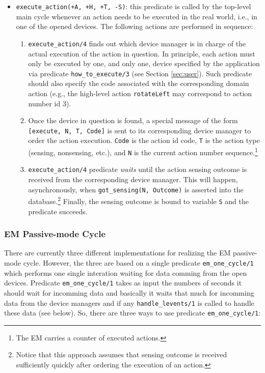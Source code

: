 \documentclass[11pt]{article}
\begin{document}
\begin{itemize}
\item \texttt{execute\_action(+A, +H, +T, -S)}: this predicate is called by the
top-level main cycle whenever an action needs to be executed in the real world,
i.e., in one of the opened devices. The following actions are performed in
sequence:
\begin{enumerate}
  \item \texttt{execute\_action/4} finds out which device manager is in
  charge of the actual execution of the action in question. In principle, each
  action must only be executed by one, and only one, device specified by the  
  application via predicate \texttt{how\_to\_execute/3} (see Section
  \ref{sec:user}). Such predicate should also specify the code associated
  with the corresponding domain action (e.g., the high-level action
  \texttt{rotateLeft} may correspond to action number id 3).
  
  \item Once the device in question is found, a special message of the form
  \texttt{[execute, N, T, Code]} is sent to its corresponding device manager
  to order the action execution. \texttt{Code} is the action id code,
  \texttt{T} is the action type (sensing, nonsensing, etc.), and \texttt{N} is
  the current action number  sequence.\footnote{The EM carries a counter of
  executed actions.}
  
  \item \texttt{execute\_action/4} predicate \textit{waits} until the action
  sensing outcome is received from the corresponding device manager.  This
  will happen, asynchronously, when \texttt{got\_sensing(N, Outcome)} is
  asserted into the database.\footnote{Notice that this approach assumes that
  sensing outcome is received sufficiently quickly after ordering the execution
  of an action.}
  Finally, the sensing outcome is bound to variable \texttt{S} and the predicate
  succeeds.
  \end{enumerate}
  
\end{itemize}




\subsubsection{EM Passive-mode Cycle}

There are currently three different implementations for realizing the EM
passive-mode cycle. However, the three are based on a single predicate
\texttt{em\_one\_cycle/1} which performs one single interation waiting for data
comming from the open devices. Predicate \texttt{em\_one\_cycle/1} takes as
input the numbers of seconds it should wait for incomming data and basically it
waits that much for incomming data from the device managers and if any
\texttt{handle\_levents/1} is called to handle these data (see below).
%
So, there are three ways to use predicate \texttt{em\_one\_cycle/1}:
\end{document}
